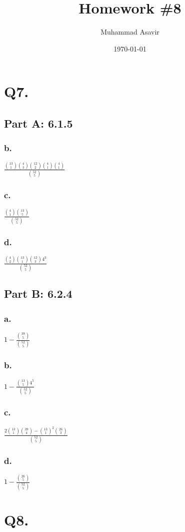 \documentclass[titlepage]{article}\pagestyle{empty}
\author{Muhammad Asavir}
\title{Homework \#8}
\date{\today}
\begin{document}
\maketitle

\pagebreak
\section*{Q7.}
\subsection*{Part A: 6.1.5}
\subsubsection*{b.} $\frac{\binom{13}{1}\binom{4}{3}\binom{12}{2}\binom{4}{1}\binom{4}{1}}{\binom{52}{5}}$
\subsubsection*{c.} $\frac{\binom{4}{1}\binom{13}{5}}{\binom{52}{5}}$
\subsubsection*{d.} $\frac{\binom{4}{2}\binom{13}{1}\binom{12}{3}4^3}{\binom{52}{5}}$
\subsection*{Part B: 6.2.4}
\subsubsection*{a.} $1 - \frac{\binom{39}{5}}{\binom{52}{5}}$
\subsubsection*{b.} $1 - \frac{\binom{13}{5}4^5}{\binom{52}{5}}$
\subsubsection*{c.} $\frac{2 \binom{13}{1} \binom{39}{4} -  \binom{13}{1}^2  \binom{26}{3}}{\binom{52}{5}}$
\subsubsection*{d.} $1 - \frac{\binom{26}{5}}{\binom{52}{5}}$

\pagebreak
\section*{Q8.}
\end{document}
